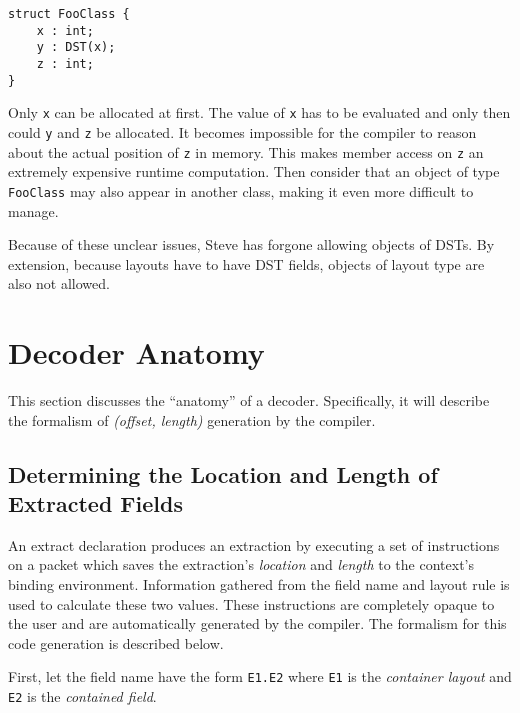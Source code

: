 \begin{codepage}
\begin{lstlisting}
struct FooClass {
	x : int;
	y : DST(x);
	z : int;
}
\end{lstlisting}
\end{codepage}

Only \texttt{x} can be allocated at first. The value of \texttt{x} has to be evaluated
and only then could \texttt{y} and \texttt{z} be allocated. It becomes impossible
for the compiler to reason about the actual position of \texttt{z} in memory. This
makes member access on \texttt{z} an extremely expensive runtime computation.
Then consider that an object of type \texttt{FooClass} may also appear in
another class, making it even more difficult to manage.

Because of these unclear issues, Steve has forgone allowing objects of DSTs.
By extension, because layouts have to have DST fields, objects of layout type
are also not allowed.


\section{Decoder Anatomy} \label{decoder_anatomy}

This section discusses the ``anatomy'' of a decoder.
Specifically, it will describe the formalism of \textit{(offset, length)} generation by the compiler.

\subsection{Determining the Location and Length of Extracted Fields}

An extract declaration produces an extraction by executing a set of instructions on a packet which saves the extraction's \textit{location} and \textit{length} to the context's binding environment. Information gathered from the field name and layout rule is used to calculate these two values. These instructions are completely opaque to the user and are automatically generated by the compiler. The formalism for this code generation is described below.

First, let the field name have the form \texttt{E1.E2} where \texttt{E1} is the \textit{container layout} and \texttt{E2} is the \textit{contained field}.

